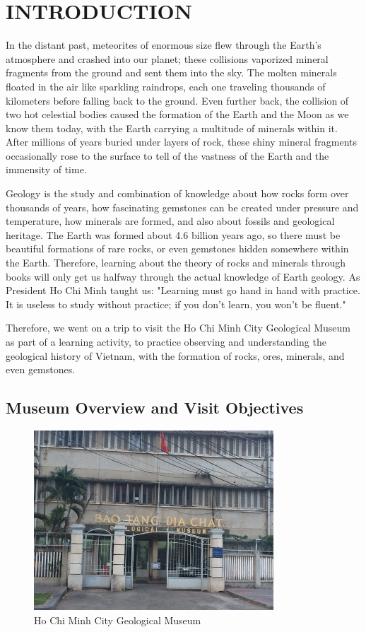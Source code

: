 \section{INTRODUCTION}
\label{sec:introduction}

In the distant past, meteorites of enormous size flew through the Earth's atmosphere and crashed into our planet; these collisions vaporized mineral fragments from the ground and sent them into the sky. The molten minerals floated in the air like sparkling raindrops, each one traveling thousands of kilometers before falling back to the ground. Even further back, the collision of two hot celestial bodies caused the formation of the Earth and the Moon as we know them today, with the Earth carrying a multitude of minerals within it. After millions of years buried under layers of rock, these shiny mineral fragments occasionally rose to the surface to tell of the vastness of the Earth and the immensity of time.

Geology is the study and combination of knowledge about how rocks form over thousands of years, how fascinating gemstones can be created under pressure and temperature, how minerals are formed, and also about fossils and geological heritage. The Earth was formed about 4.6 billion years ago, so there must be beautiful formations of rare rocks, or even gemstones hidden somewhere within the Earth. Therefore, learning about the theory of rocks and minerals through books will only get us halfway through the actual knowledge of Earth geology. As President Ho Chi Minh taught us: "Learning must go hand in hand with practice. It is useless to study without practice; if you don't learn, you won't be fluent."

Therefore, we went on a trip to visit the Ho Chi Minh City Geological Museum as part of a learning activity, to practice observing and understanding the geological history of Vietnam, with the formation of rocks, ores, minerals, and even gemstones.

\subsection{Museum Overview and Visit Objectives}
\label{subsec:museum-overview}

\begin{figure}[H]
  \centering
  \includegraphics[width=0.8\textwidth]{graphics/figure_01.jpg}
  \caption{Ho Chi Minh City Geological Museum}
  \label{fig:museum}
\end{figure}

